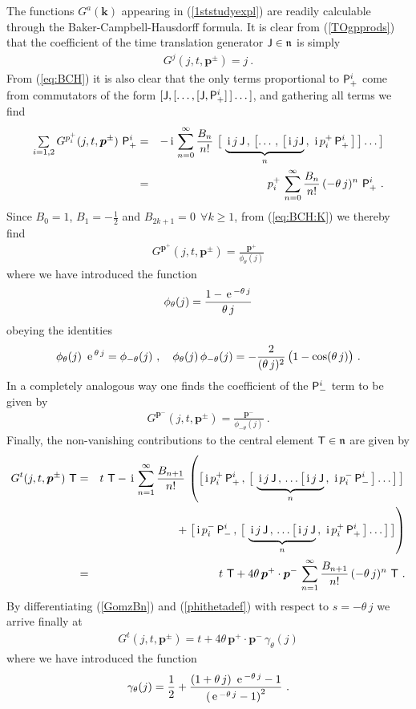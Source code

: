 \documentclass[11pt,a4paper]{article}
\newcommand{\1}{\mathbb{1}}
\newcommand{\mbf}[1]{{\boldsymbol {#1} }}
\def\ii{{\,{\rm i}\,}}
\def\P{{\sf P}}
\def\T{{\sf T}}
\def\J{{\sf J}}
\def\mk{{\mbf k}}
\def\mbp{{\mbf p}}
\def\mfn{{\mathfrak n}}
\def\e{{\,\rm e}\,}
\def\bea{\begin{eqnarray}}
\def\eea{\end{eqnarray}}
\newcommand{\beq}{\begin{eqnarray}}
\newcommand{\eeq}{\end{eqnarray}}
\begin{document}
The functions $G^a(\mk)$ appearing in (\ref{1ststudyexpl}) are readily
calculable through the Baker-Campbell-Hausdorff formula. It is clear
from (\ref{TOgpprods}) that the coefficient of the time translation
generator $\J\in\mfn$ is simply
\beq
G^j(j,t,\mbp^\pm)=j \ .
\label{Gj}\eeq
{}From (\ref{eq:BCH}) it is also clear that the only terms proportional
to $\P^i_+$ come from commutators of the form
$[\J,[\dots,[\J,\P^i_+]\,]\dots]$, and gathering all terms we find
\bea
\mbox{$\sum\limits_{i=1,2}$}\,
G^{p_i^+}(j,t,\mbp^\pm)~\P^i_+&=&-\ii\sum_{n=0}^\infty
\frac{B_n}{n!}~\bigl[~\underbrace{\ii j\,\J\,,\,\bigl[\dots\,,\,
\bigl[\ii j\J}_n\,,\,\ii p_i^+\,\P^i_+\,\bigr]\,\bigr]
\dots\bigr]\nonumber\\ &=&
p_i^+\,\sum_{n=0}^\infty\frac{B_n}{n!}\,
(-\theta\,j)^n~\P^i_+ \ .
\label{GomzBn}\eea
Since $B_0=1$, $B_1=-\frac12$ and $B_{2k+1}=0~~\forall k\geq1$, from
(\ref{eq:BCH:K}) we thereby find
\beq
G^{\mbp^+}(j,t,\mbp^\pm)=\frac{\mbp^+}
{\phi_\theta(j)}
\label{Gomz}\eeq
where we have introduced the function
\beq
\phi_\theta(j)=\frac{1-\e^{-\theta\,j}}{\theta\,j}
\label{phithetadef}\eeq
obeying the identities
\beq
\phi_\theta(j)~\e^{\theta\,j}=\phi_{-\theta}(j) \ , \quad
\phi_\theta(j)\,\phi_{-\theta}(j)=-\frac2{(\theta\,j)^2}\,\bigl(
1-\cos(\theta\,j)\bigr) \ .
\label{phithetaids}\eeq
In a completely analogous way one finds the coefficient of the
$\P^i_-$ term to be given by
\beq
G^{\mbp^-}(j,t,\mbp^\pm)=\frac{\mbp^-}
{{\phi_{-\theta}(j)}} \ .
\label{Gmz}\eeq
Finally, the non-vanishing contributions to the central
element $\T\in\mfn$ are given by
\bea
G^t(j,t,\mbp^\pm)~\T&=&
t~\T-\ii\sum_{n=1}^\infty\frac{B_{n+1}}{n!}\,
\left(\bigl[\ii p_i^+\,\P^i_+\,,\,\bigl[~
\underbrace{\ii j\,\J\,,\,\dots\bigl[\ii j\,\J}_n\,,\,\ii p_i^-\,
\P^i_-\,\bigr]\dots\bigr]\,\bigr]\right.\nonumber\\ &&\qquad\qquad\qquad
+\left.\bigl[\ii p_i^-\,\P^i_-\,,\,\bigl[~
\underbrace{\ii j\,\J\,,\,\dots\bigl[\ii j\,\J}_n\,,\,
\ii p_i^+\,\P^i_+\,\bigr]\dots\bigr]\,\bigr]\right)
\nonumber\\ &=&t~\T+4\theta\,\mbp^+\cdot\mbp^-\,\sum_{n=1}^\infty\frac{B_{n+1}}
{n!}\,(-\theta\,j)^n~\T \ .
\label{GtBn}\eea
By differentiating (\ref{GomzBn}) and (\ref{phithetadef}) with respect
to $s=-\theta\,j$ we arrive finally at
\beq
G^t(j,t,\mbp^\pm)=t+4\theta\,\mbp^+\cdot\mbp^-\,
\gamma_\theta(j)
\label{Gt}\eeq
where we have introduced the function
\beq
\gamma_\theta(j)=\frac12+\frac{(1+\theta\,j)~\e^{-\theta\,j}-1}
{\left(\e^{-\theta\,j}-1\right)^2} \ .
\label{gammathetadef}\eeq
\end{document}
